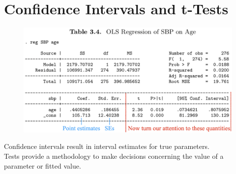 \documentclass[14pt]{extarticle}
\begin{document}
\section*{Confidence Intervals and t-Tests}
\begin{figure}[H]
    \centering
    \includegraphics[width=1\textwidth]{fig6.png}
\end{figure}

\noindent
Confidence intervals result in interval estimates for true parameters. \\
Tests provide a methodology to make decisions concerning the value of a parameter or fitted value.
\end{document}
